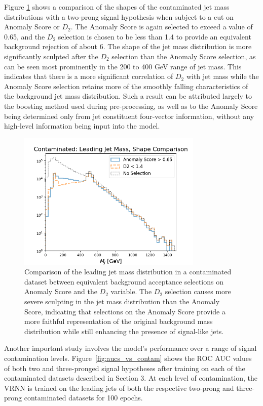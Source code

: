 \documentclass[11pt, a4paper]{article}
\begin{document}
Figure \ref{fig:d2_comp} shows a comparison of the shapes of the contaminated jet mass distributions with a two-prong signal hypothesis when subject to a cut on Anomaly Score or $D_2$. The Anomaly Score is again selected to exceed a value of 0.65, and the $D_2$ selection is chosen to be less than 1.4 to provide an equivalent background rejection of about 6. The shape of the jet mass distribution is more significantly sculpted after the $D_2$ selection than the Anomaly Score selection, as can be seen most prominently in the 200 to 400 GeV range of jet mass. This indicates that there is a more significant correlation of $D_2$ with jet mass while the Anomaly Score selection retains more of the smoothly falling characteristics of the background jet mass distribution. Such a result can be attributed largely to the boosting method used during pre-processing, as well as to the Anomaly Score being determined only from jet constituent four-vector information, without any high-level information being input into the model. 

\begin{figure}[H]
	\begin{center}
		\includegraphics[width=250pt]{imgs/2Prong_Contaminated_10p0_J_Mass_EventScore0p65_Multi_D2Comp_Lead_SaveForPaper.png}
	\end{center}
	\caption{Comparison of the leading jet mass distribution in a contaminated dataset between equivalent background acceptance selections on Anomaly Score and the $D_2$ variable. The $D_2$ selection causes more severe sculpting in the jet mass distribution than the Anomaly Score, indicating that selections on the Anomaly Score provide a more faithful representation of the original background mass distribution while still enhancing the presence of signal-like jets.}
	\label{fig:d2_comp}
\end{figure}


Another important study involves the model's performance over a range of signal contamination
levels. Figure~\ref{fig:aucs_vs_contam} shows the ROC AUC values of both two and three-pronged signal hypotheses
after training on each of the contaminated datasets described in Section 3. 
At each level of contamination, the VRNN is trained on the leading jets of both the respective two-prong and three-prong contaminated datasets for 100 epochs. 
\end{document}
